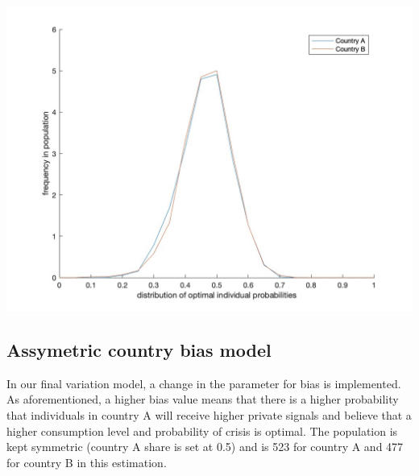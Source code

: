 \documentclass[11pt,preprint, authoryear]{elsarticle}
\let\origfigure\figure
\let\endorigfigure\endfigure
\renewenvironment{figure}[1][2] {
    \expandafter\origfigure\expandafter[H]
} {
    \endorigfigure
}
\numberwithin{equation}{section}
\numberwithin{figure}{section}
\numberwithin{table}{section}
\begin{document}
\begin{figure}[H]

{\centering \includegraphics[width=0.8\linewidth]{images/Fig4_0.5Size0Bias} 

}

\caption{Symmetric country size model: Kernel density function of the distribution of the optimal probabilty of crisis and frequency thereof across individuals in country A and country B}\label{fig:unnamed-chunk-6}
\end{figure}

\hypertarget{assymetric-country-bias-model}{%
\subsection*{Assymetric country bias
model}\label{assymetric-country-bias-model}}

In our final variation model, a change in the parameter for bias is
implemented. As aforementioned, a higher bias value means that there is
a higher probability that individuals in country A will receive higher
private signals and believe that a higher consumption level and
probability of crisis is optimal. The population is kept symmetric
(country A share is set at 0.5) and is 523 for country A and 477 for
country B in this estimation.
\end{document}
